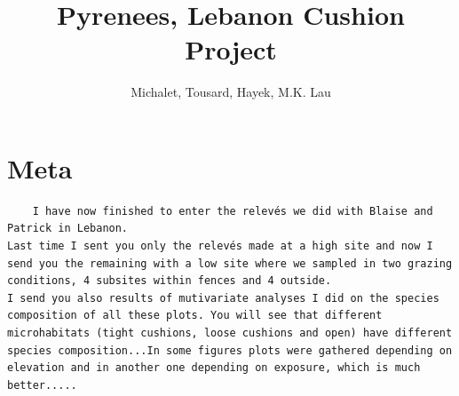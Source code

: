 \documentclass[12pt]{article}
\title{Pyrenees, Lebanon Cushion Project}
\author{Michalet, Tousard, Hayek, M.K. Lau}
\begin{document}
\maketitle

\setcounter{tocdepth}{3}  %
\tableofcontents

\section{Meta}

\begin{verbatim}
    I have now finished to enter the relevés we did with Blaise and
Patrick in Lebanon.
Last time I sent you only the relevés made at a high site and now I
send you the remaining with a low site where we sampled in two grazing
conditions, 4 subsites within fences and 4 outside.
I send you also results of mutivariate analyses I did on the species
composition of all these plots. You will see that different
microhabitats (tight cushions, loose cushions and open) have different
species composition...In some figures plots were gathered depending on
elevation and in another one depending on exposure, which is much better.....
\end{verbatim}
\end{document}
